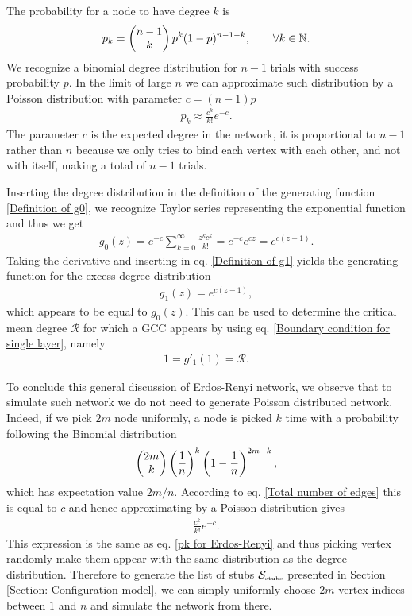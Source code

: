 \documentclass[
11pt, %
english, %
singlespacing, %
nolistspacing, %
liststotoc, %
headsepline, %
]{MastersDoctoralThesis} %
\begin{document}
The probability for a node to have degree $k$ is
\begin{align}
	p_k = \begin{pmatrix} n-1 \\ k \end{pmatrix} p^k (1 - p)^{n - 1 - k}, \qquad \forall k \in \mathbb{N}. \label{Poisson degree distribution}
\end{align}
We recognize a binomial degree distribution for $n-1$ trials with success probability $p$. In the limit of large $n$ we can approximate such distribution by a Poisson distribution with parameter $c = (n - 1) p$
\begin{align}
	p_k \approx \frac{c^k}{k!} e^{-c}.  \label{pk for Erdos-Renyi}
\end{align}
The parameter $c$ is the expected degree in the network, it is proportional to $n - 1$ rather than $n$ because we only tries to bind each vertex with each other, and not with itself, making a total of $n-1$ trials.

Inserting the degree distribution in the definition of the generating function \eqref{Definition of g0}, we recognize Taylor series representing the exponential function and thus we get
\begin{align}
	g_0(z) = e^{-c} \sum_{k = 0}^\infty \frac{z^k c^k}{k!} = e^{-c} e^{c z} = e^{c(z - 1)}. \label{g0 for ER networks}
\end{align}
Taking the derivative and inserting in eq. \eqref{Definition of g1} yields the generating function for the excess degree distribution
\begin{align} 
	g_1(z) = e^{c(z - 1)},
\end{align}
which appears to be equal to $g_0(z)$. This can be used to determine the critical mean degree $\mathcal{R}$ for which a GCC appears by using eq. \eqref{Boundary condition for single layer}, namely
\begin{align}
	1 = g'_1(1) = \mathcal{R}. \label{g1 for ER networks}
\end{align}

To conclude this general discussion of Erdos-Renyi network, we observe that to simulate such network we do not need to generate Poisson distributed network. Indeed, if we pick $2 m$ node uniformly, a node is picked $k$ time with a probability following the Binomial distribution
\begin{align}
	\begin{pmatrix} 2m \\ k \end{pmatrix} \left(\frac{1}{n}\right)^k \left(1 - \frac{1}{n}\right)^{2 m - k},
\end{align}
which has expectation value $2 m/n$. According to eq. \eqref{Total number of edges} this is equal to $c$ and hence approximating by a Poisson distribution gives
\begin{align}
	\frac{c^k}{k!} e^{-c}.
\end{align}
This expression is the same as eq. \eqref{pk for Erdos-Renyi} and thus picking vertex randomly make them appear with the same distribution as the degree distribution. Therefore to generate the list of stubs $\mathcal{S}_{\text{\tiny stubs}}$ presented in Section \ref{Section: Configuration model}, we can simply uniformly choose $2m$ vertex indices between $1$ and $n$ and simulate the network from there.
\end{document}
